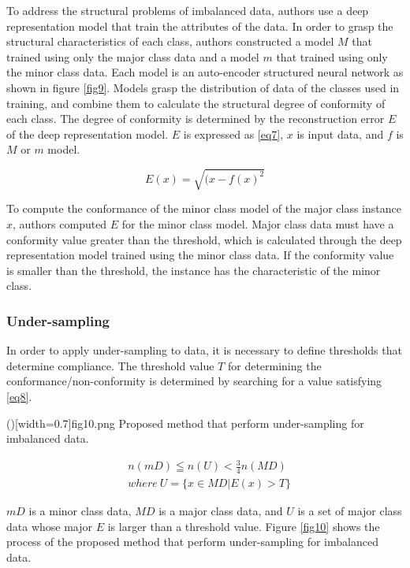 \documentclass{ieeeaccess}
\begin{document}
To address the structural problems of imbalanced data, authors use a deep representation model that train the attributes of the data.
In order to grasp the structural characteristics of each class, authors constructed a model $M$ that trained using only the major class data and a model $m$ that trained using only the minor class data.
Each model is an auto-encoder structured neural network as shown in figure \ref{fig9}. 
Models grasp the distribution of data of the classes used in training, and combine them to calculate the structural degree of conformity of each class.
The degree of conformity is determined by the reconstruction error $E$ of the deep representation model.
$E$ is expressed as \eqref{eq7}, $x$ is input data, and $f$ is $M$ or $m$ model.

\begin{equation}
	\label{eq7}
		E(x) = \sqrt{(x-f(x)^2}
\end{equation}

To compute the conformance of the minor class model of the major class instance $x$, authors computed $E$ for the minor class model. 
Major class data must have a conformity value greater than the threshold, which is calculated through the deep representation model trained using the minor class data. 
If the conformity value is smaller than the threshold, the instance has the characteristic of the minor class.

\subsubsection{Under-sampling}
In order to apply under-sampling to data, it is necessary to define thresholds that determine compliance. 
The threshold value $T$ for determining the conformance/non-conformity is determined by searching for a value satisfying \eqref{eq8}.

\Figure[t]()[width=0.7\textwidth]{fig10.png}
   {Proposed method that perform under-sampling for imbalanced data.\label{fig10}}

\begin{equation}
	\begin{split}
		\label{eq8}
			& n(mD) \leqq n(U) < \frac{3}{4}n(MD) \\
			& where\ U=\{x \in MD | E(x)>T\}
	\end{split}
\end{equation}

$mD$ is a minor class data, $MD$ is a major class data, and $U$ is a set of major class data whose major $E$ is larger than a threshold value.
Figure \ref{fig10} shows the process of the proposed method that perform under-sampling for imbalanced data.
\end{document}
